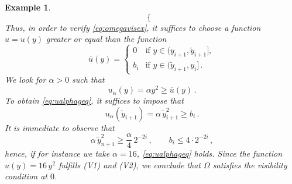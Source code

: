 \documentclass[a4paper,reqno,11pt]{amsart}
\newtheorem{example}[theorem]{Example}
\begin{document}
\begin{example}
\begin{equation*}
\begin{cases}
	\end{cases}
\end{equation*}
Thus, in order to verify \eqref{eq:omegavisex}, it suffices to choose a function $u = u(y)$ greater or equal than the function
\begin{equation*}
	\overline{u}(y) =
	\begin{cases}
		0 & \text{if } y \in (y_{i+1}, \tilde{y}_{i+1}],\\ 
	    b_i &  \text{if } y \in (\tilde{y}_{i+1}, y_i] \, .
	\end{cases}
\end{equation*}
We look for $\alpha > 0$ such that
\begin{equation} \label{eq:ualphageq}
	u_\alpha(y) = \alpha y^2 \geq \overline{u}(y) \, .
\end{equation}
To obtain \eqref{eq:ualphageq}, it suffices to impose that
\begin{equation*}
	u_\alpha(\tilde{y}_{i+1}) = \alpha \, \tilde{y}_{i+1}^2 \geq b_i \, .
\end{equation*}
It is immediate to observe that
\begin{equation*}
	\alpha \, \tilde{y}_{n+1}^2 \geq \dfrac{\alpha}{4} \, 2^{-2i} \, , \qquad b_i \leq 4 \cdot 2^{-2i} \, ,
\end{equation*}
hence, if for instance we take $\alpha = 16$, \eqref{eq:ualphageq} holds. Since the function $u(y) = 16 \, y^2$ fulfills (V1) and (V2), we conclude that $\Omega$ satisfies the visibility condition at $0$.
\end{example}

		
\end{document}

